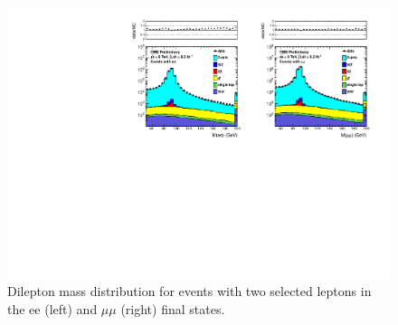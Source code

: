 \begin{figure}[hbt]
  \begin{center}
	\includegraphics[width=1.0\linewidth]{plots/dilmass_92fb.pdf}
	\caption{
	  \label{fig:dilmass}\protect 
	  Dilepton mass distribution for events with two selected leptons
	  in the ee (left) and $\mu\mu$ (right) final states.}


  \end{center}
\end{figure}


